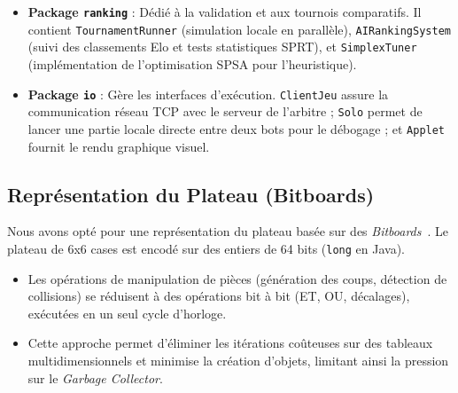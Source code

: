 \documentclass[12pt,a4paper]{article}
\begin{document}
\begin{itemize}
    \item \textbf{Package \texttt{ranking}} : Dédié à la validation et aux tournois comparatifs. Il contient \texttt{TournamentRunner} (simulation locale en parallèle), \texttt{AIRankingSystem} (suivi des classements Elo et tests statistiques SPRT), et \texttt{SimplexTuner} (implémentation de l'optimisation SPSA pour l'heuristique).
    \item \textbf{Package \texttt{io}} : Gère les interfaces d'exécution. \texttt{ClientJeu} assure la communication réseau TCP avec le serveur de l'arbitre ; \texttt{Solo} permet de lancer une partie locale directe entre deux bots pour le débogage ; et \texttt{Applet} fournit le rendu graphique visuel.
\end{itemize}

\subsection{Représentation du Plateau (Bitboards)}
Nous avons opté pour une représentation du plateau basée sur des \textit{Bitboards}~\cite{cp_bitboards}. Le plateau de 6x6 cases est encodé sur des entiers de 64 bits (\texttt{long} en Java).
\begin{itemize}
    \item Les opérations de manipulation de pièces (génération des coups, détection de collisions) se réduisent à des opérations bit à bit (ET, OU, décalages), exécutées en un seul cycle d'horloge.
    \item Cette approche permet d'éliminer les itérations coûteuses sur des tableaux multidimensionnels et minimise la création d'objets, limitant ainsi la pression sur le \textit{Garbage Collector}.
\end{itemize}
\end{document}
